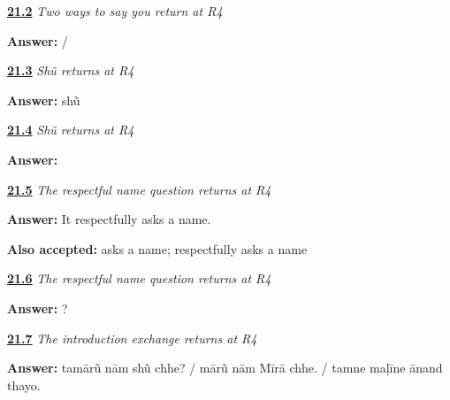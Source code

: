 \noindent\begin{minipage}[t]{\linewidth}
\raggedright
\hyperlink{review-GU-R17-you-r4-writing}{\textbf{21.2}} \emph{Two ways to say you return at R4}\par
\small \textbf{Answer:}  / \par
\end{minipage}\par\medskip

\noindent\begin{minipage}[t]{\linewidth}
\raggedright
\hyperlink{review-GU-R17-shun-r4-listening}{\textbf{21.3}} \emph{Shũ returns at R4}\par
\small \textbf{Answer:} shũ\par
\end{minipage}\par\medskip

\noindent\begin{minipage}[t]{\linewidth}
\raggedright
\hyperlink{review-GU-R17-shun-r4-writing}{\textbf{21.4}} \emph{Shũ returns at R4}\par
\small \textbf{Answer:} \par
\end{minipage}\par\medskip

\noindent\begin{minipage}[t]{\linewidth}
\raggedright
\hyperlink{review-GU-R17-whats-your-name-r4-listening}{\textbf{21.5}} \emph{The respectful name question returns at R4}\par
\small \textbf{Answer:} It respectfully asks a name.\par
\footnotesize \textbf{Also accepted:} asks a name; respectfully asks a name
\end{minipage}\par\medskip

\noindent\begin{minipage}[t]{\linewidth}
\raggedright
\hyperlink{review-GU-R17-whats-your-name-r4-writing}{\textbf{21.6}} \emph{The respectful name question returns at R4}\par
\small \textbf{Answer:}    ?\par
\end{minipage}\par\medskip

\noindent\begin{minipage}[t]{\linewidth}
\raggedright
\hyperlink{review-GU-R17-introduction-r4-listening}{\textbf{21.7}} \emph{The introduction exchange returns at R4}\par
\small \textbf{Answer:} tamārũ nām shũ chhe? / mārũ nām Mīrā chhe. / tamne maḷīne ānand thayo.\par
\end{minipage}\par\medskip

